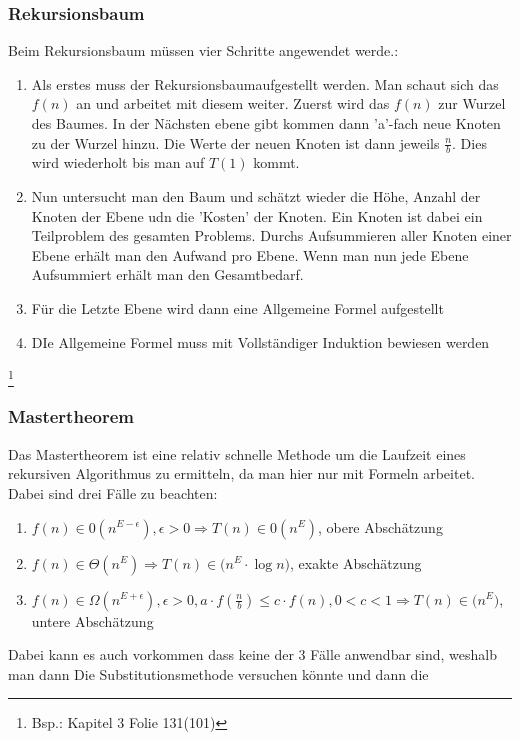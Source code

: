 \documentclass[a4paper]{scrartcl}
\begin{document}
        \subsubsection*{Rekursionsbaum}
        Beim Rekursionsbaum müssen vier Schritte angewendet werde.:
        \begin{enumerate}
            \item Als erstes muss der Rekursionsbaumaufgestellt werden. Man schaut sich das \(f(n)\) an und arbeitet mit diesem weiter. Zuerst wird das \(f(n)\) zur Wurzel des Baumes.
                In der Nächsten ebene gibt kommen dann 'a'-fach neue Knoten zu der Wurzel hinzu. Die Werte der neuen Knoten ist dann jeweils \(\frac{n}{b}\). Dies wird wiederholt bis
                man auf \(T(1)\) kommt.
            \item Nun untersucht man den Baum und schätzt wieder die Höhe, Anzahl der Knoten der Ebene udn die 'Kosten' der Knoten. Ein Knoten ist dabei ein Teilproblem des gesamten Problems.
                Durchs Aufsummieren aller Knoten einer Ebene erhält man den Aufwand pro Ebene. Wenn man nun jede Ebene Aufsummiert erhält man den Gesamtbedarf. 
            \item Für die Letzte Ebene wird dann eine Allgemeine Formel aufgestellt
            \item DIe Allgemeine Formel muss mit Vollständiger Induktion bewiesen werden
        \end{enumerate}\footnote{Bsp.: Kapitel 3 Folie 131(101)}

        \subsubsection*{Mastertheorem}
        Das Mastertheorem ist eine relativ schnelle Methode um die Laufzeit eines rekursiven Algorithmus zu ermitteln, da man hier nur mit Formeln arbeitet. Dabei sind drei Fälle zu 
        beachten: 
        \begin{enumerate}
            \item \(f(n) \in \mathcal{0}(n^{E - \epsilon}), \epsilon > 0 \Rightarrow T(n) \in \mathcal{0}(n^E) \), obere Abschätzung
            \item \(f(n) \in \Theta(n^{E}) \Rightarrow T(n) \in \mathcal(n^E \cdot \log n) \), exakte Abschätzung
            \item \(f(n) \in \Omega(n^{E + \epsilon}), \epsilon > 0, a \cdot f(\frac{n}{b}) \le c \cdot f(n), 0 < c < 1 \Rightarrow T(n) \in \mathcal(n^E) \), untere Abschätzung
        \end{enumerate} 
        Dabei kann es auch vorkommen dass keine der 3 Fälle anwendbar sind, weshalb man dann Die Substitutionsmethode versuchen könnte und dann die 
    
\end{document}
